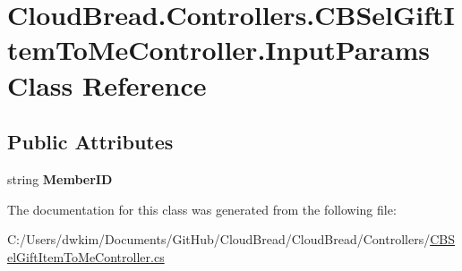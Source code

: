 \hypertarget{class_cloud_bread_1_1_controllers_1_1_c_b_sel_gift_item_to_me_controller_1_1_input_params}{}\section{Cloud\+Bread.\+Controllers.\+C\+B\+Sel\+Gift\+Item\+To\+Me\+Controller.\+Input\+Params Class Reference}
\label{class_cloud_bread_1_1_controllers_1_1_c_b_sel_gift_item_to_me_controller_1_1_input_params}
\subsection*{Public Attributes}
\begin{DoxyCompactItemize}
\item 
string {\bfseries Member\+ID}\hypertarget{class_cloud_bread_1_1_controllers_1_1_c_b_sel_gift_item_to_me_controller_1_1_input_params_adecba5ea79e54e571b0515229cd0b02f}{}\label{class_cloud_bread_1_1_controllers_1_1_c_b_sel_gift_item_to_me_controller_1_1_input_params_adecba5ea79e54e571b0515229cd0b02f}

\end{DoxyCompactItemize}


The documentation for this class was generated from the following file\+:\begin{DoxyCompactItemize}
\item 
C\+:/\+Users/dwkim/\+Documents/\+Git\+Hub/\+Cloud\+Bread/\+Cloud\+Bread/\+Controllers/\hyperlink{_c_b_sel_gift_item_to_me_controller_8cs}{C\+B\+Sel\+Gift\+Item\+To\+Me\+Controller.\+cs}\end{DoxyCompactItemize}
